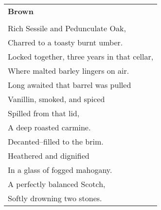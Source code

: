 \documentclass{article}
\begin{document}
\begin{center}
\begin{tabular}{l}
\textbf{Brown} \\
\\
Rich Sessile and Pedunculate Oak, \\
Charred to a toasty burnt umber. \\
Locked together, three years in that cellar, \\
Where malted barley lingers on air. \\
Long awaited that barrel was pulled \\
Vanillin, smoked, and spiced \\
Spilled from that lid, \\
A deep roasted carmine. \\
Decanted--filled to the brim. \\
Heathered and dignified \\
In a glass of fogged mahogany. \\
A perfectly balanced Scotch, \\
Softly drowning two stones. \\
\end{tabular}
\end{center}
\end{document}
